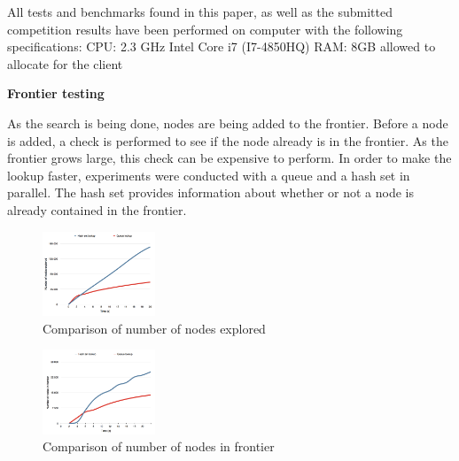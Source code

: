 \documentclass[Main]{subfiles}
\begin{document}
All tests and benchmarks found in this paper, as well as the submitted competition results have been performed on computer with the following specifications:
CPU: 2.3 GHz Intel Core i7 (I7-4850HQ) 
RAM: 8GB allowed to allocate for the client


\textbf{Frontier testing}

As the search is being done, nodes are being added to the frontier. Before a node is added, a check is performed to see if the node already is in the frontier. As the frontier grows large, this check can be expensive to perform. In order to make the lookup faster, experiments were conducted with a queue and a hash set in parallel. The hash set provides information about whether or not a node is already contained in the frontier.


\begin{figure}[h!]
    \centering
    \includegraphics[width=0.3\textwidth]{nodes_explored_compare.png}
    \caption{Comparison of number of nodes explored}
    \label{fig:node_explored_comparison}
\end{figure}

\begin{figure}[h!]
    \centering
    \includegraphics[width=0.3\textwidth]{nodes_in_frontier_compare.png}
    \caption{Comparison of number of nodes in frontier}
    \label{fig:node_frontier_comparison}
\end{figure}








\end{document}

